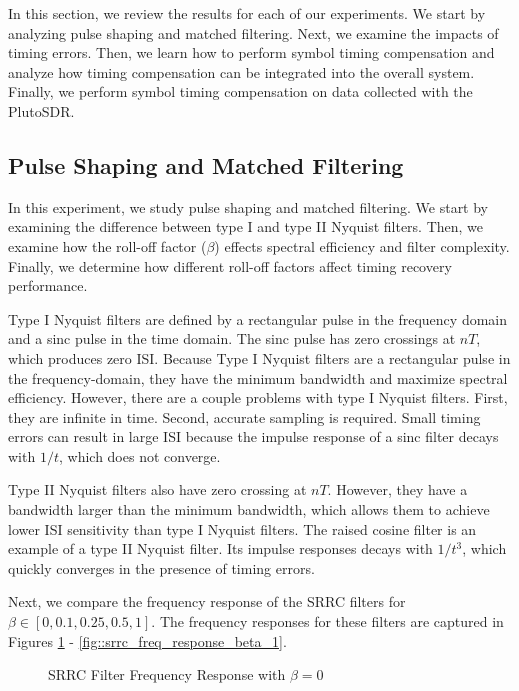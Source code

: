 \documentclass{article}
\begin{document}
In this section, we review the results for each of our experiments. We start by analyzing pulse shaping and matched filtering. Next, we examine the impacts of timing errors. Then, we learn how to perform symbol timing compensation and analyze how timing compensation can be integrated into the overall system. Finally, we perform symbol timing compensation on data collected with the PlutoSDR.

\subsection{Pulse Shaping and Matched Filtering}

In this experiment, we study pulse shaping and matched filtering. We start by examining the difference between type I and type II Nyquist filters. Then, we examine how the roll-off factor ($\beta$) effects spectral efficiency and filter complexity. Finally, we determine how different roll-off factors affect timing recovery performance.

Type I Nyquist filters are defined by a rectangular pulse in the frequency domain and a sinc pulse in the time domain. The sinc pulse has zero crossings at $nT$, which produces zero ISI. Because Type I Nyquist filters are a rectangular pulse in the frequency-domain, they have the minimum bandwidth and maximize spectral efficiency. However, there are a couple problems with type I Nyquist filters. First, they are infinite in time. Second, accurate sampling is required. Small timing errors can result in large ISI because the impulse response of a sinc filter decays with $1/t$, which does not converge.

Type II Nyquist filters also have zero crossing at $nT$. However, they have a bandwidth larger than the minimum bandwidth, which allows them to achieve lower ISI sensitivity than type I Nyquist filters. The raised cosine filter is an example of a type II Nyquist filter. Its impulse responses decays with $1/t^3$, which quickly converges in the presence of timing errors.

Next, we compare the frequency response of the SRRC filters for $\beta \in [0,0.1,0.25,0.5,1]$. The frequency responses for these filters are captured in Figures \ref{fig::srrc_freq_response_beta_0} - \ref{fig::srrc_freq_response_beta_1}.

\begin{figure}[H]
	\centerline{}
	\caption{SRRC Filter Frequency Response with $\beta=0$}
	\label{fig::srrc_freq_response_beta_0}
\end{figure}
\end{document}
